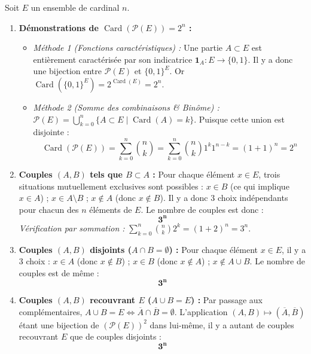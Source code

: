\documentclass[11pt,a4paper]{article}
\newcommand{\un}{\mathbf{1}}
\begin{document}
\begin{correctionbox}
Soit $E$ un ensemble de cardinal $n$.
\begin{enumerate}
    \item \textbf{Démonstrations de $\operatorname{Card}(\mathscr{P}(E)) = 2^n$ :}
    \begin{itemize}[label=$\bullet$]
        \item \emph{Méthode 1 (Fonctions caractéristiques) :} Une partie $A \subset E$ est entièrement caractérisée par son indicatrice $\un_A : E \to \{0, 1\}$. Il y a donc une bijection entre $\mathscr{P}(E)$ et $\{0, 1\}^E$.
        Or $\operatorname{Card}(\{0, 1\}^E) = 2^{\operatorname{Card}(E)} = 2^n$.
        \item \emph{Méthode 2 (Somme des combinaisons \& Binôme) :} $\mathscr{P}(E) = \bigcup_{k=0}^n \{ A \subset E \mid \operatorname{Card}(A) = k \}$.
        Puisque cette union est disjointe :
        \[
        \operatorname{Card}(\mathscr{P}(E)) = \sum_{k=0}^n \binom{n}{k} = \sum_{k=0}^n \binom{n}{k} 1^k 1^{n-k} = (1 + 1)^n = 2^n
        \]
    \end{itemize}

    \item \textbf{Couples $(A, B)$ tels que $B \subset A$ :}
    Pour chaque élément $x \in E$, trois situations mutuellement exclusives sont possibles :
    $x \in B$ (ce qui implique $x \in A$) ; $x \in A \setminus B$ ; $x \notin A$ (donc $x \notin B$).
    Il y a donc 3 choix indépendants pour chacun des $n$ éléments de $E$.
    Le nombre de couples est donc :
    \[
    \mathbf{3^n}
    \]
    \emph{Vérification par sommation :} $\sum_{k=0}^n \binom{n}{k} 2^k = (1 + 2)^n = 3^n$.

    \item \textbf{Couples $(A, B)$ disjoints ($A \cap B = \emptyset$) :}
    Pour chaque élément $x \in E$, il y a 3 choix : $x \in A$ (donc $x \notin B$) ; $x \in B$ (donc $x \notin A$) ; $x \notin A \cup B$.
    Le nombre de couples est de même :
    \[
    \mathbf{3^n}
    \]

    \item \textbf{Couples $(A, B)$ recouvrant $E$ ($A \cup B = E$) :}
    Par passage aux complémentaires, $A \cup B = E \iff \overline{A} \cap \overline{B} = \emptyset$.
    L'application $(A, B) \mapsto (\overline{A}, \overline{B})$ étant une bijection de $(\mathscr{P}(E))^2$ dans lui-même, il y a autant de couples recouvrant $E$ que de couples disjoints :
    \[
    \mathbf{3^n}
    \]


\end{enumerate}
\end{correctionbox}
\end{document}

